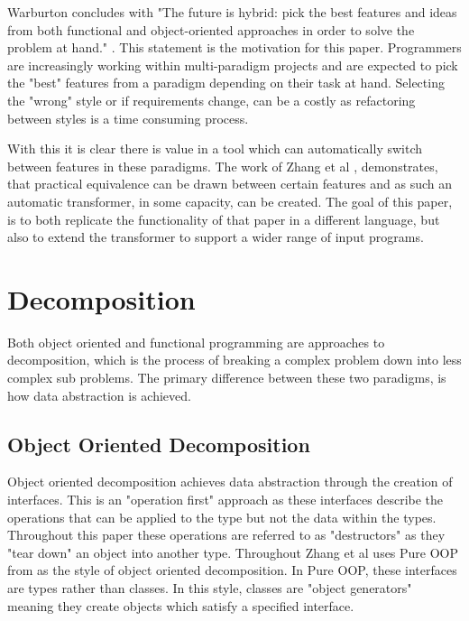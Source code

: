 \documentclass[ oneside,%
                    author={James Elgar},
                    degree={MEng},
                     title={Bidirectional transformer between functional and \\ object-oriented programming in Rust},
                  subtitle={}]{dissertation}
\newcommand{\weixin}{Zhang et al }
\begin{document}
Warburton concludes with "The future is hybrid: pick the best features and ideas from both
functional and object-oriented approaches in order to solve the
problem at hand." \cite{warburton}. This statement is the motivation for this paper. Programmers are increasingly working within multi-paradigm projects and are expected to pick the "best" features from a paradigm depending on their task at hand. Selecting the "wrong" style or if requirements change, can be a costly as refactoring between styles is a time consuming process.

With this it is clear there is value in a tool which can automatically switch between features in these paradigms. The work of \weixin \cite{food}, demonstrates, that practical equivalence can be drawn between certain features and as such an automatic transformer, in some capacity, can be created. The goal of this paper, is to both replicate the functionality of that paper in a different language, but also to extend the transformer to support a wider range of input programs.

\section{Decomposition}


Both object oriented and functional programming are approaches to decomposition, which is the process of breaking a complex problem down into less complex sub problems. The primary difference between these two paradigms, is how data abstraction is achieved.

\subsection{Object Oriented Decomposition}

Object oriented decomposition achieves data abstraction through the creation of interfaces. This is an "operation first" \cite{food} approach as these interfaces describe the operations that can be applied to the type but not the data within the types.
Throughout this paper these operations are referred to as "destructors" as they "tear down" an object into another type.
Throughout \cite{food} \weixin uses Pure OOP from \cite{cook} as the style of object oriented decomposition. In Pure OOP, these interfaces are types rather than classes.
In this style, classes are "object generators" \cite{food} meaning they create objects which satisfy a specified interface.
\end{document}
